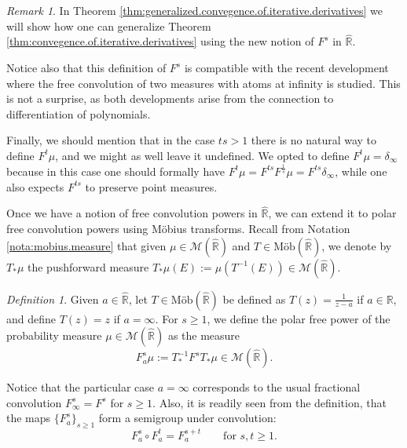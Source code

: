 \documentclass[reqno,11pt]{amsart}
\theoremstyle{remark}
\newtheorem{remark}[theorem]{Remark}
\newtheorem{definition}[theorem]{Definition}
\newcommand{\rr}{\mathbb{R}}
\newcommand{\MM}{\mathcal{M}}
\newcommand{\freepower}[1]{F^{#1}}
\newcommand{\pfreepower}[2]{F_{#1}^{#2}}
\newcommand{\mobr}{\text{Möb}(\hat{\rr})}
\begin{document}
\begin{remark}
 In Theorem \ref{thm:generalized.convegence.of.iterative.derivatives}
we will show how one can generalize Theorem \ref{thm:convegence.of.iterative.derivatives} using the new notion of $\freepower{s}$ in $\hat{\rr}$.

Notice also that this definition of $\freepower{s}$ is compatible with the recent development \cite[Proposition 7.1]{jalowy2025zeros} where the free convolution of two measures with atoms at infinity is studied. This is not a surprise, as both developments arise from the connection to differentiation of polynomials.

Finally, we should mention that in the case $ts> 1$ there is no natural way to define $\freepower{t}\mu$, and we might as well leave it undefined. We opted to define $\freepower{t}\mu=\delta_\infty$ because in this case one should formally have $ \freepower{t}\mu = \freepower{ts}\freepower{\tfrac{1}{s}}\mu = \freepower{ts}\delta_\infty $, while one also expects $ \freepower{ts} $ to preserve point measures.
\end{remark}

Once we have a notion of free convolution powers in $\hat{\rr}$, we can extend it to polar free convolution powers using Möbius transforms. Recall from Notation \ref{nota:mobius.measure} that given $ \mu \in \MM(\hat{\rr})$ and $ T\in\mobr$, we denote by $ T_*\mu $ the pushforward measure $ T_*\mu(E) := \mu( T^{-1}(E) )\in \MM(\hat{\rr}) $. 

\begin{definition}
\label{def:poler.free.power}
Given $a\in \hat{\rr}$, let $ T\in\mobr$ be defined as $T(z)=\frac{1}{z-a}$ if $a\in \rr$, and define $T(z)=z$ if $a=\infty$. For $s\geq 1$, we define the polar free power of the probability measure $\mu\in\MM(\hat{\rr})$ as the measure 
$$ \pfreepower{a}{s} \mu := T^{-1}_*\freepower{s} T_*\mu \in\MM(\hat{\rr}).$$
\end{definition}
Notice that the particular case $a=\infty$ corresponds to the usual fractional convolution $\pfreepower{\infty}{s} = \freepower{s}$ for $s\geq 1$. Also, it is readily seen from the definition, that the maps $\{ \pfreepower{a}{s}\}_{s\geq 1}$ form a semigroup under convolution:
\begin{equation}
\label{eq:semigroup.polar.free.power}
 \pfreepower{a}{s}\circ \pfreepower{a}{t}=\pfreepower{a}{s+t} \qquad \text{for } s,t\geq 1.   
\end{equation}
\end{document}

